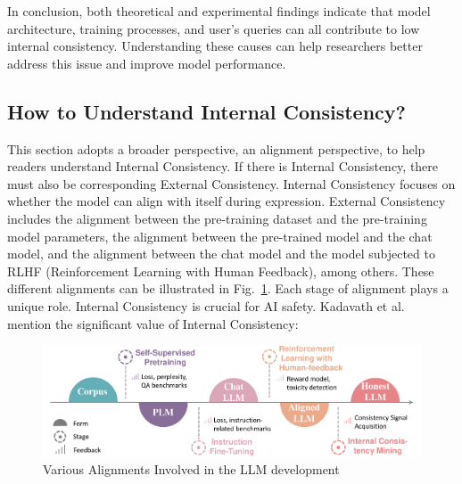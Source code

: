 \documentclass[lettersize,journal]{IEEEtran}
\begin{document}
In conclusion, both theoretical and experimental findings indicate that model architecture, training processes, and user's queries can all contribute to low internal consistency. Understanding these causes can help researchers better address this issue and improve model performance.



\subsection{How to Understand Internal Consistency?}


\noindent This section adopts a broader perspective, an alignment perspective, to help readers understand Internal Consistency. If there is Internal Consistency, there must also be corresponding External Consistency. Internal Consistency focuses on whether the model can align with itself during expression. External Consistency includes the alignment between the pre-training dataset and the pre-training model parameters, the alignment between the pre-trained model and the chat model, and the alignment between the chat model and the model subjected to RLHF (Reinforcement Learning with Human Feedback), among others. These different alignments can be illustrated in Fig.~\ref{fig:full_consistency}. Each stage of alignment plays a unique role. Internal Consistency is crucial for AI safety. Kadavath et al.~\cite{TheoryKnowKnow_22_arXiv_Anthropic} mention the significant value of Internal Consistency:

\begin{figure}[t!]
    \centering
    \includegraphics[width=\linewidth]{figures/full_consistency.pdf}
    \caption{Various Alignments Involved in the LLM development}
    \label{fig:full_consistency}
\end{figure}
\end{document}
